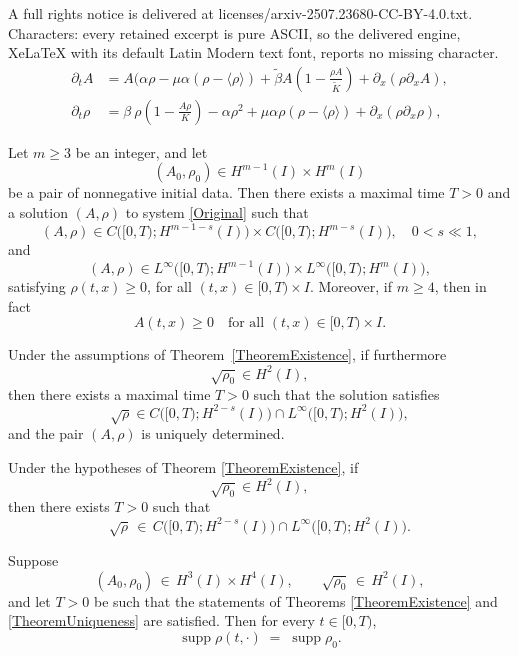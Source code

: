 \documentclass[10pt,a4paper]{amsart}
\begin{document}
A full rights notice is delivered at licenses/arxiv-2507.23680-CC-BY-4.0.txt. Characters: every retained excerpt is pure ASCII, so the delivered engine, XeLaTeX with its default Latin Modern text font, reports no missing character.
	  \begin{equation}\label{Original}		
		\begin{aligned}
			\partial_t A&= A(\alpha\rho-\mu\alpha(\rho-\langle \rho \rangle)+\widetilde{\beta}A\left(1-\frac{\rho A}{\widetilde{K}} \right)+\partial_x(\rho \partial_x A) ,\\
			\partial_t\rho&=\beta\ \rho\left(1-\frac{A\rho}{K} \right)-\alpha\rho^2+\mu\alpha\rho(\rho-\langle \rho\rangle)+\partial_x(\rho \partial_{x}\rho),
		\end{aligned}
	\end{equation}

\begin{theorem}\label{TheoremExistence}
Let $m\ge3$ be an integer, and let
\[
(A_0,\rho_0)\in H^{m-1}(I)\times H^m(I)
\]
be a pair of nonnegative initial data.  Then there exists a maximal time $T>0$ and a solution $(A,\rho)$  to system \eqref{Original} such that
\[
(A,\rho)\in C\bigl([0,T);H^{m-1 -s}(I)\bigr)\times C\bigl([0,T);H^{m -s}(I)\bigr), \quad 0<s\ll1,
\]
and
$$(A,\rho)\in L^\infty \bigl([0,T);H^{m-1}(I)\bigr)\times L^\infty\bigl([0,T);H^m (I)\bigr),$$  satisfying $\rho(t,x)\ge0$, for all $(t,x)\in[0,T)\times I$.  Moreover, if $m\ge4$, then in fact
\[
A(t,x)\ge0
\quad
\text{for all }(t,x)\in[0,T)\times I.
\]
\end{theorem}

\begin{theorem}[Uniqueness]\label{TheoremUniqueness}
Under the assumptions of Theorem~\ref{TheoremExistence}, if furthermore
\[
\sqrt{\rho_{0}}\in H^{2}(I),
\]
then  there exists a maximal time $T>0$ such that the solution satisfies
\[
\sqrt{\rho}\in C \bigl([0,T);H^{2-s}(I)\bigr) \cap L^\infty \bigl([0,T);H^{2}(I)\bigr),
\]
and the pair $(A,\rho)$ is uniquely determined.
\end{theorem}

\begin{lemma}\label{RootLemma}
Under the hypotheses of Theorem \ref{TheoremExistence}, if 
\[
\sqrt{\rho_{0}}\in H^{2}(I),
\]
then there exists $T>0$ such that
\[
\sqrt{\rho}\,\in\, C \bigl([0,T);H^{2-s}(I)\bigr) \cap L^\infty \bigl([0,T);H^{2}(I)\bigr).
\]
\end{lemma}

\begin{proposition}\label{SupportRho}
Suppose
\[
(A_0,\rho_0)\,\in\,H^3(I)\times H^4(I),
\qquad
\sqrt{\rho_0}\,\in\,H^2(I),
\]
and let $T>0$ be such that the statements of Theorems \ref{TheoremExistence} and \ref{TheoremUniqueness} are satisfied.
Then for every $t\in[0,T)$,
\[
\operatorname{supp}\rho(t,\cdot)
\;=\;
\operatorname{supp}\rho_0.
\]
\end{proposition}
\end{document}
